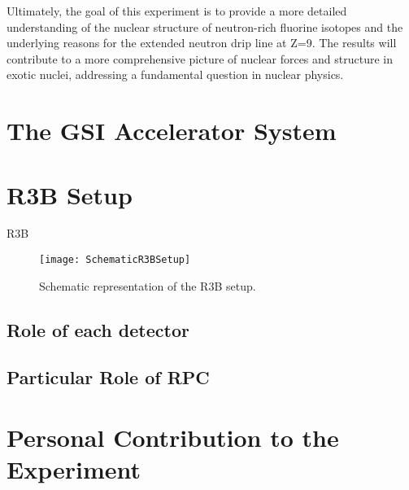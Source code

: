 Ultimately, the goal of this experiment is to provide a more detailed understanding of the nuclear structure of neutron-rich fluorine isotopes and the underlying reasons for the extended neutron drip line at Z=9. The results will contribute to a more comprehensive picture of nuclear forces and structure in exotic nuclei, addressing a fundamental question in nuclear physics.


\section{The GSI Accelerator System}


\section{R3B Setup}

\gls{R3B}


\begin{figure}
	\texttt{[image: SchematicR3BSetup]}
	\caption{Schematic representation of the R3B setup.}
	\label{fig:R3BSetup}
\end{figure}


\subsection{Role of each detector}



\subsection{Particular Role of RPC}



\section{Personal Contribution to the Experiment}